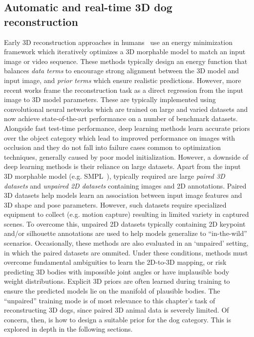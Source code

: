
\subsection{Automatic and real-time 3D dog reconstruction}

Early 3D reconstruction approaches in humans~ use an energy minimization framework which iteratively optimizes a 3D morphable model to match an input image or video sequence. These methods typically design an energy function that balances \emph{data terms} to encourage strong alignment between the 3D model and input image, and \emph{prior terms} which ensure realistic predictions. However, more recent works frame the reconstruction task as a direct regression from the input image to 3D model parameters. These are typically implemented using convolutional neural networks which are trained on large and varied datasets and now achieve state-of-the-art performance on a number of benchmark datasets. Alongside fast test-time performance, deep learning methods learn accurate priors over the object category which lead to improved performance on images with occlusion and they do not fall into failure cases common to optimization techniques, generally caused by poor model initialization. However, a downside of deep learning methods is their reliance on large datasets. Apart from the input 3D morphable model (e.g. SMPL~), typically required are large \emph{paired 3D datasets} and \emph{unpaired 2D datasets} containing images and 2D annotations. Paired 3D datasets help models learn an association between input image features and 3D shape and pose parameters. However, such datasets require specialized equipment to collect (e.g. motion capture) resulting in limited variety in captured scenes. To overcome this, unpaired 2D datasets typically containing 2D keypoint and/or silhouette annotations are used to help models generalize to ``in-the-wild'' scenarios. Occasionally, these methods are also evaluated in an `unpaired' setting, in which the paired datasets are ommited. Under these conditions, methods must overcome fundamental ambiguities to learn the 2D-to-3D mapping, or risk predicting 3D bodies with impossible joint angles or have implausible body weight distributions. Explicit 3D priors are often learned during training to ensure the predicted models lie on the manifold of plausible bodies. The ``unpaired'' training mode is of most relevance to this chapter's task of reconstructing 3D dogs, since paired 3D animal data is severely limited. Of concern, then, is how to design a suitable prior for the dog category. This is explored in depth in the following sections.

